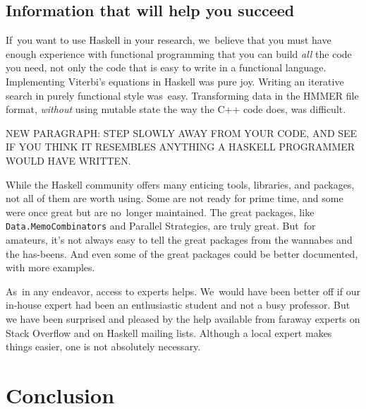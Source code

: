 \documentclass[]{jfp1}
\newcommand\seclabel[1]{\label{sec:#1}}
\begin{document}
\subsection{Information that will help you succeed}

If~you want to use Haskell in your research, we~believe that you must
have enough experience with functional programming that you can build
\emph{all} the code you need, not only the code that is easy to write
in a functional language.
Implementing Viterbi's equations in Haskell was pure joy.
Writing an iterative search in purely functional style was~easy.
Transforming data in the HMMER file format, \emph{without}
using mutable state the way the C++ code does, was difficult.

NEW PARAGRAPH: STEP SLOWLY AWAY FROM YOUR CODE, AND SEE IF YOU THINK
IT RESEMBLES ANYTHING A HASKELL PROGRAMMER WOULD HAVE WRITTEN.


\seclabel{penumbra}

While the Haskell community offers many
enticing tools, libraries, and packages,
not all of them are worth using.
Some are not ready for prime time, and some were once great but are
no~longer maintained.
The great packages, like \texttt{Data.MemoCombinators} and Parallel
Strategies, are truly great.
But~for amateurs, it's not always easy to tell the great packages from the wannabes
and the has-beens.
And even some of the great packages could be better documented, with
more examples.



As~in any endeavor, access to experts helps.
We~would have been better off if our in-house expert had been an
enthusiastic student and not a busy professor.
But we have been surprised and pleased by the help available from
faraway experts on Stack Overflow and on Haskell mailing lists.
Although a local expert makes things easier, one is not
 absolutely necessary.

\section{Conclusion}
\end{document}
